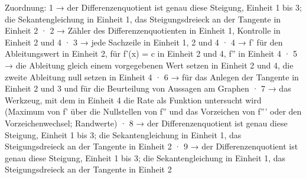 
Zuordnung: 1 → der Differenzenquotient ist genau diese Steigung, Einheit 1 bis 3; die Sekantengleichung in Einheit 1, das Steigungsdreieck an der Tangente in Einheit 2 · 2 → Zähler des Differenzenquotienten in Einheit 1, Kontrolle in Einheit 2 und 4 · 3 → jede Sachzeile in Einheit 1, 2 und 4 · 4 → f' für den Ableitungswert in Einheit 2, für f'(x) = c in Einheit 2 und 4, f'' in Einheit 4 · 5 → die Ableitung gleich einem vorgegebenen Wert setzen in Einheit 2 und 4, die zweite Ableitung null setzen in Einheit 4 · 6 → für das Anlegen der Tangente in Einheit 2 und 3 und für die Beurteilung von Aussagen am Graphen · 7 → das Werkzeug, mit dem in Einheit 4 die Rate als Funktion untersucht wird (Maximum von f' über die Nullstellen von f'' und das Vorzeichen von f''' oder den Vorzeichenwechsel; Randwerte) · 8 → der Differenzenquotient ist genau diese Steigung, Einheit 1 bis 3; die Sekantengleichung in Einheit 1, das Steigungsdreieck an der Tangente in Einheit 2 · 9 → der Differenzenquotient ist genau diese Steigung, Einheit 1 bis 3; die Sekantengleichung in Einheit 1, das Steigungsdreieck an der Tangente in Einheit 2


